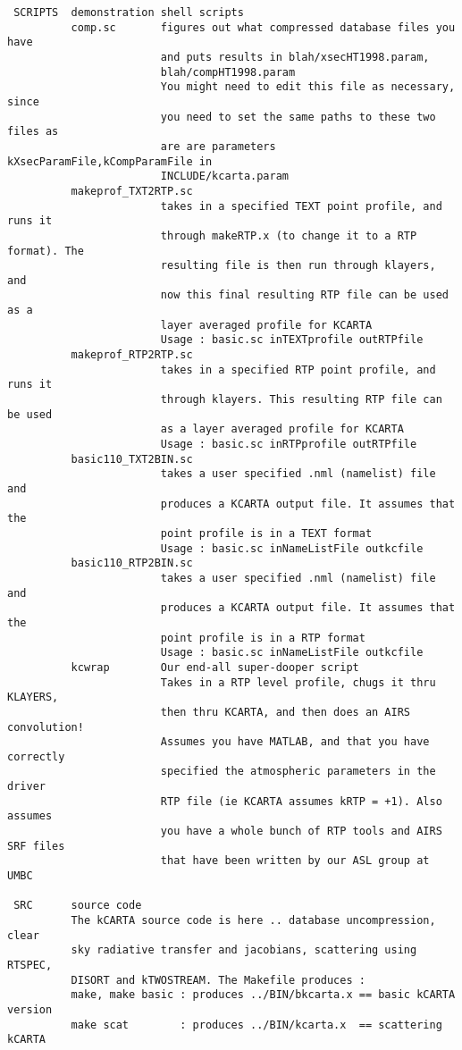 \documentclass[11pt]{article}
\begin{document}
\begin{verbatim}
 SCRIPTS  demonstration shell scripts
          comp.sc       figures out what compressed database files you have
                        and puts results in blah/xsecHT1998.param,
                        blah/compHT1998.param
                        You might need to edit this file as necessary, since 
                        you need to set the same paths to these two files as 
                        are are parameters kXsecParamFile,kCompParamFile in 
                        INCLUDE/kcarta.param
          makeprof_TXT2RTP.sc 
                        takes in a specified TEXT point profile, and runs it
                        through makeRTP.x (to change it to a RTP format). The
                        resulting file is then run through klayers, and 
                        now this final resulting RTP file can be used as a
                        layer averaged profile for KCARTA
                        Usage : basic.sc inTEXTprofile outRTPfile
          makeprof_RTP2RTP.sc 
                        takes in a specified RTP point profile, and runs it
                        through klayers. This resulting RTP file can be used 
                        as a layer averaged profile for KCARTA
                        Usage : basic.sc inRTPprofile outRTPfile
          basic110_TXT2BIN.sc      
                        takes a user specified .nml (namelist) file and 
                        produces a KCARTA output file. It assumes that the
                        point profile is in a TEXT format
                        Usage : basic.sc inNameListFile outkcfile
          basic110_RTP2BIN.sc      
                        takes a user specified .nml (namelist) file and 
                        produces a KCARTA output file. It assumes that the
                        point profile is in a RTP format
                        Usage : basic.sc inNameListFile outkcfile
          kcwrap        Our end-all super-dooper script
                        Takes in a RTP level profile, chugs it thru KLAYERS,
                        then thru KCARTA, and then does an AIRS convolution!
                        Assumes you have MATLAB, and that you have correctly
                        specified the atmospheric parameters in the driver
                        RTP file (ie KCARTA assumes kRTP = +1). Also assumes
                        you have a whole bunch of RTP tools and AIRS SRF files
                        that have been written by our ASL group at UMBC

 SRC      source code 
          The kCARTA source code is here .. database uncompression, clear
          sky radiative transfer and jacobians, scattering using RTSPEC,
          DISORT and kTWOSTREAM. The Makefile produces :
          make, make basic : produces ../BIN/bkcarta.x == basic kCARTA version
          make scat        : produces ../BIN/kcarta.x  == scattering kCARTA 


\end{verbatim}
\end{document}

